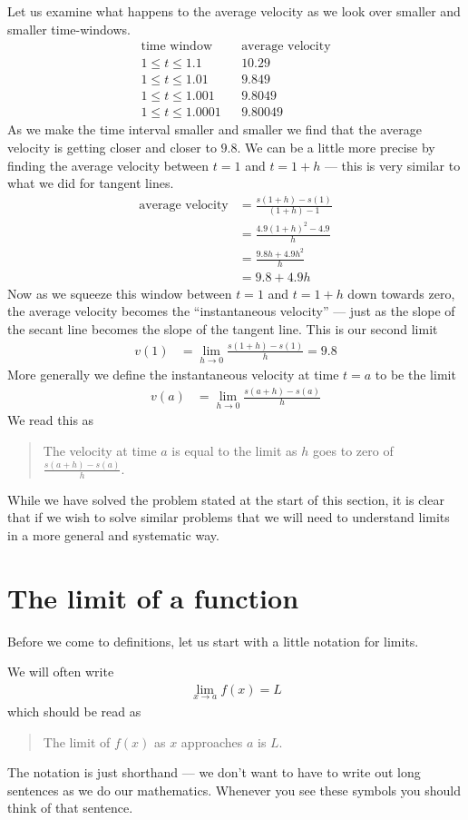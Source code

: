 Let us examine what happens to the average velocity as we look over smaller and
smaller time-windows.
\begin{align*}
  \text{time window} && \text{average velocity}\\
  1 \leq t \leq 1.1 && 10.29 \\
  1 \leq t \leq 1.01 && 9.849 \\
  1 \leq t \leq 1.001 && 9.8049 \\
  1 \leq t \leq 1.0001 && 9.80049
\end{align*}
As we make the time interval smaller and smaller we find that the average
velocity is getting closer and closer to $9.8$. We can be a little more precise
by finding the average velocity between $t=1$ and $t=1+h$ --- this is very
similar to what we did for tangent lines.
\begin{align*}
  \text{average velocity} &= \frac{s(1+h) - s(1)}{(1+h)-1} \\
  &= \frac{4.9(1+h)^2 - 4.9}{h} \\
  &= \frac{9.8h + 4.9h^2}{h} \\
  &= 9.8 + 4.9h
\end{align*}
Now as we squeeze this window between $t=1$ and $t=1+h$ down towards zero, the
average velocity becomes the ``instantaneous velocity'' --- just as the
slope of the secant line becomes the slope of the tangent line. This is
our second limit
\begin{align*}
 v(1) &= \lim_{h \to 0} \frac{s(1+h)-s(1)}{h} = 9.8
\end{align*}
More generally we define the instantaneous velocity at time $t=a$ to be the
limit
\begin{align*}
  v(a) &= \lim_{h \to 0} \frac{ s(a+h) - s(a) }{h}
\end{align*}
We read this as
\begin{quote}
 The velocity at time $a$ is equal to the limit as $h$ goes to zero of
$\frac{s(a+h)-s(a)}{h}$.
\end{quote}

While we have solved the problem stated at the start of this section, it is
clear that if we wish to solve similar problems that we will need to
understand limits in a more general and systematic way.

\section{The limit of a function}
\label{sec lim func}

Before we come to definitions, let us start with a little notation for limits.
\begin{notn}
We will often write
\begin{align*}
  \lim_{x \to a} f(x) = L
\end{align*}
which should be read as
\begin{quote}
The limit of $f(x)$ as $x$ approaches $a$ is $L$.
\end{quote}
\end{notn}
The notation is just shorthand --- we don't want to have to write out long
sentences as we do our mathematics. Whenever you see these symbols you
should think of that sentence.

